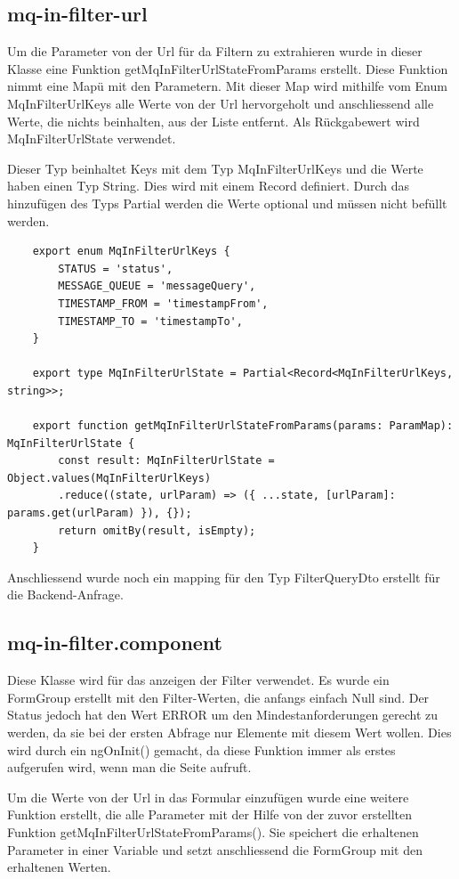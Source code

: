 \subsection{mq-in-filter-url}
Um die Parameter von der Url für da Filtern zu extrahieren wurde in dieser Klasse eine Funktion getMqInFilterUrlStateFromParams erstellt. Diese Funktion nimmt eine Mapü mit den Parametern. Mit dieser Map wird mithilfe vom Enum MqInFilterUrlKeys alle Werte von der Url hervorgeholt und anschliessend alle Werte, die nichts beinhalten, aus der Liste entfernt. Als Rückgabewert wird MqInFilterUrlState verwendet.

Dieser Typ beinhaltet Keys mit dem Typ MqInFilterUrlKeys und die Werte haben einen Typ String. Dies wird mit einem Record definiert. Durch das hinzufügen des Typs Partial werden die Werte optional und müssen nicht befüllt werden.

\begin{verbatim}
	export enum MqInFilterUrlKeys {
		STATUS = 'status',
		MESSAGE_QUEUE = 'messageQuery',
		TIMESTAMP_FROM = 'timestampFrom',
		TIMESTAMP_TO = 'timestampTo',
	}
	
	export type MqInFilterUrlState = Partial<Record<MqInFilterUrlKeys, string>>;
	
	export function getMqInFilterUrlStateFromParams(params: ParamMap): MqInFilterUrlState {
		const result: MqInFilterUrlState = Object.values(MqInFilterUrlKeys)
		.reduce((state, urlParam) => ({ ...state, [urlParam]: params.get(urlParam) }), {});
		return omitBy(result, isEmpty);
	}
\end{verbatim}

Anschliessend wurde noch ein mapping für den Typ FilterQueryDto erstellt für die Backend-Anfrage.

\subsection{mq-in-filter.component}
Diese Klasse wird für das anzeigen der Filter verwendet. Es wurde ein FormGroup erstellt mit den Filter-Werten, die anfangs einfach Null sind. Der Status jedoch hat den Wert ERROR um den Mindestanforderungen gerecht zu werden, da sie bei der ersten Abfrage nur Elemente mit diesem Wert wollen. Dies wird durch ein ngOnInit() gemacht, da diese Funktion immer als erstes aufgerufen wird, wenn man die Seite aufruft.

Um die Werte von der Url in das Formular einzufügen wurde eine weitere Funktion erstellt, die alle Parameter mit der Hilfe von der zuvor erstellten Funktion getMqInFilterUrlStateFromParams(). Sie speichert die erhaltenen Parameter in einer Variable und setzt anschliessend die FormGroup mit den erhaltenen Werten.

